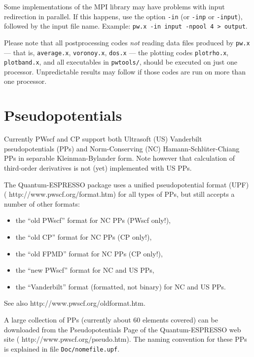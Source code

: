 \documentclass[12pt,a4paper]{article}
\begin{document}
Some implementations of the MPI library may have problems with
input redirection in parallel.
If this happens, use the option \texttt{-in} (or \texttt{-inp} or
\texttt{-input}), followed by the input file name.
Example: \texttt{pw.x -in input -npool 4 > output}.

Please note that all postprocessing codes \emph{not} reading data
files produced by \texttt{pw.x} --- that is,
\texttt{average.x}, \texttt{voronoy.x}, \texttt{dos.x} --- the
plotting codes \texttt{plotrho.x}, \texttt{plotband.x}, and all
executables in \texttt{pwtools/}, should be executed on just one
processor.
Unpredictable results may follow if those codes are run on more than
one processor.

\clearpage

\section{Pseudopotentials}
  \label{pseudopotentials}

Currently PWscf and CP support both Ultrasoft (US) Vanderbilt
pseudopotentials (PPs) and Norm-Conserving (NC)
Hamann-Schl\"uter-Chiang PPs in separable Kleinman-Bylander form.
Note however that calculation of third-order derivatives is not (yet)
implemented with US PPs. 

The Quantum-ESPRESSO package uses a unified pseudopotential format (UPF)
(%
                   {http://www.pwscf.org/format.htm})
for all types of PPs, but still accepts a number of other formats:
\begin{itemize}
  \item the ``old PWscf'' format for NC PPs (PWscf only!),
  \item the ``old CP'' format for NC PPs (CP only!),
  \item the ``old FPMD'' format for NC PPs (CP only!),
  \item the ``new PWscf'' format for NC and US PPs,
  \item the ``Vanderbilt'' format (formatted, not binary) for NC and
        US PPs.
\end{itemize}
See also
%
                  {http://www.pwscf.org/oldformat.htm}.

A large collection of PPs (currently about 60 elements covered) can
be downloaded from the Pseudopotentials Page of the Quantum-ESPRESSO
web site
(%
                   {http://www.pwscf.org/pseudo.htm}).
The naming convention for these PPs is explained in file
\texttt{Doc/nomefile.upf}.
\end{document}
